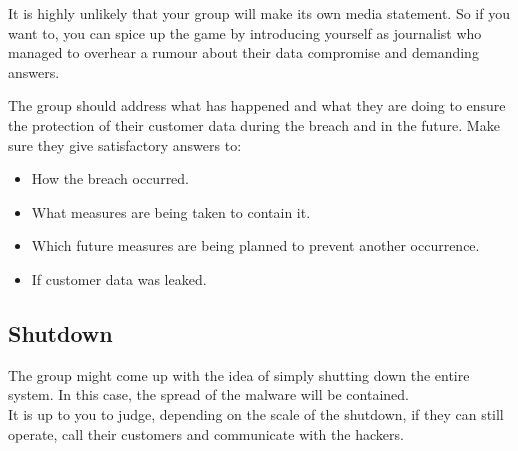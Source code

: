 \begin{hint}
    It is highly unlikely that your group will make its own media statement.
    So if you want to, you can spice up the game by introducing yourself as journalist who managed to overhear a rumour about their data compromise and demanding answers.
\end{hint}
The group should address what has happened and what they are doing to ensure the protection of their customer data during the breach and in the future.
Make sure they give satisfactory answers to:

\begin{itemize}
    \item How the breach occurred.
    \item What measures are being taken to contain it.
    \item Which future measures are being planned to prevent another occurrence.
    \item If customer data was leaked.
\end{itemize}

\subsection{Shutdown}

The group might come up with the idea of simply shutting down the entire system.
In this case, the spread of the malware will be contained.
\\

It is up to you to judge, depending on the scale of the shutdown, if they can still operate, call their customers and communicate with the hackers.
